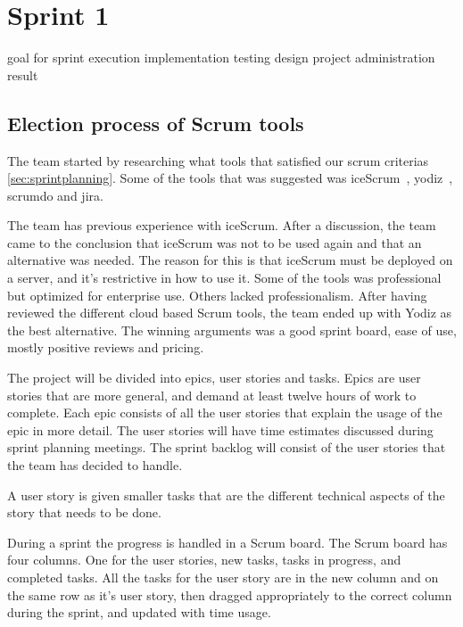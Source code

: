 \section{Sprint 1}
goal for sprint
execution
implementation
testing
design
project administration
result

\subsection{Election process of Scrum tools}
\label{sec:scrumtools}
The team started by researching what tools that satisfied our scrum criterias \ref{sec:sprintplanning}. Some of the tools that was suggested was iceScrum~\cite{icescrum}, yodiz~\cite{yodiz}, scrumdo and jira.

The team has previous experience with iceScrum. After a discussion, the team came to the conclusion
that iceScrum was not to be used again and that an alternative was needed. The reason for this is that iceScrum must be deployed on a server, and it's restrictive in how to use it.
Some of the tools was professional but optimized for enterprise use. Others lacked professionalism.
After having reviewed the different cloud based Scrum tools, the team ended up with Yodiz as the best alternative. The winning arguments was a
good sprint board, ease of use, mostly positive reviews and pricing.

The project will be divided into epics, user stories and tasks. Epics are user stories that are more general,
and demand at least twelve hours of work to complete. Each epic consists
of all the user stories that explain the usage of the epic in more detail.
The user stories will have time estimates discussed during sprint planning meetings.
The sprint backlog will consist of the user stories that the team has decided to handle.

A user story is given smaller tasks that are the different technical aspects of the story that needs to be done.

During a sprint the progress is handled in a Scrum board. The Scrum board has four columns. One for the user stories, new tasks, tasks in progress, and completed tasks.
All the tasks for the user story are in the new column and on the same row as it's user story, then dragged appropriately to the correct column during the sprint, and updated with time usage.

